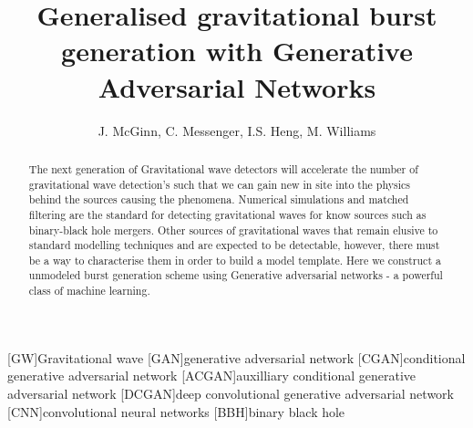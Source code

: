 \documentclass[12pt]{iopart}
\newcommand{\dcc}{LIGO-PXXXXXXX}
\begin{document}
\title{Generalised gravitational burst generation with Generative Adversarial Networks}

\author{J. McGinn, C. Messenger, I.S. Heng, M. Williams}

\address{University of Glasgow, Physics \& Astronomy Department, Glasgow G12 8QQ, UK}
\vspace{10pt}

\begin{abstract}
The next generation of Gravitational wave detectors will accelerate the number
of gravitational wave detection's such that we can gain new in site into the
physics behind the sources causing the phenomena. Numerical simulations and
matched filtering are the standard for detecting gravitational waves for know
sources such as binary-black hole mergers. Other sources of gravitational waves
that remain elusive to standard modelling techniques and are expected to be
detectable, however, there must be a way to characterise them in order to build
a model template. Here we construct a unmodeled burst generation scheme using
Generative adversarial networks - a powerful class of machine learning.
\end{abstract}

%
%
%
% 
%

[GW]{Gravitational wave}
[GAN]{generative adversarial network}
[CGAN]{conditional generative adversarial network}
[ACGAN]{auxilliary conditional generative adversarial network}
[DCGAN]{deep convolutional generative adversarial network}
[CNN]{convolutional neural networks}
[BBH]{binary black hole}
\end{document}
